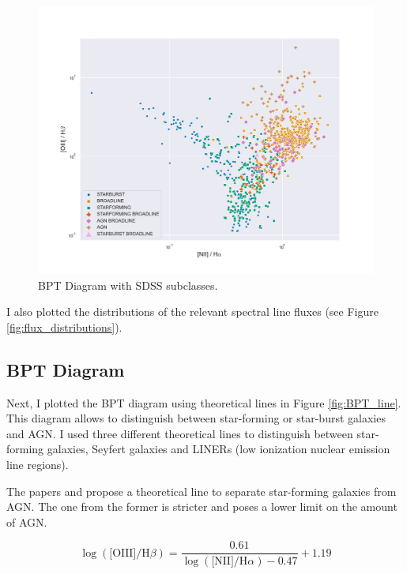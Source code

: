 \documentclass[letterpaper, oneside]{article}
\begin{document}
\begin{figure}[h]
	\centering
	\includegraphics[width=1.1\textwidth]{../BPT_diagram_sdss_subclasses.pdf}
	\caption{BPT Diagram with SDSS subclasses.}
	\label{fig:BPT_subclasses}
\end{figure}

I also plotted the distributions of the relevant spectral line fluxes (see Figure \ref{fig:flux_distributions}).

\subsection{BPT Diagram}\label{bpt_diagram_section}

Next, I plotted the BPT diagram using theoretical lines in Figure \ref{fig:BPT_line}. This diagram allows to distinguish between star-forming or star-burst galaxies and AGN. I used three different theoretical lines to distinguish between star-forming galaxies, Seyfert galaxies and LINERs (low ionization nuclear emission line regions).

The papers \cite{Kewley_2001} and \cite{Kauffmann_2003} propose a theoretical line to separate star-forming galaxies from AGN. The one from the former is stricter and poses a lower limit on the amount of AGN.

\begin{equation} \label{kewley}
	\log{ \left(  \text{[OIII]} / {\text{H}\beta} \right)  } = \frac{0.61}{\log{ \left(  \text{[NII]} / {\text{H}\alpha} \right)  } - 0.47} + 1.19
\end{equation}
\end{document}
